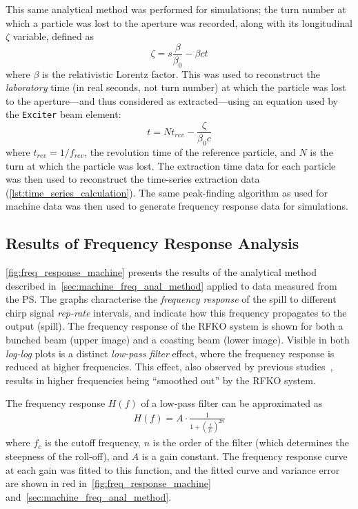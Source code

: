 \documentclass[11pt]{report}
\begin{document}
This same analytical method was performed for simulations; the turn number at which a particle was lost to the aperture was recorded, along with its longitudinal $\zeta$ variable, defined as
\begin{equation}
  \zeta = s \frac{\beta}{\beta_0} - \beta c t
\end{equation}
where $\beta$ is the relativistic Lorentz factor. This was used to reconstruct the \textit{laboratory} time (in real seconds, not turn number) at which the particle was lost to the aperture---and thus considered as extracted---using an equation used by the \verb|Exciter| beam element:
\begin{equation}
  t = N t_{rev} - \frac\zeta{\beta_0 c}
\end{equation}
where $t_{rev}=1/f_{rev}$, the revolution time of the reference particle, and $N$ is the turn at which the particle was lost. The extraction time data for each particle was then used to reconstruct the time-series extraction data (\autoref{lst:time_series_calculation}). The same peak-finding algorithm as used for machine data was then used to generate frequency response data for simulations.


\subsection{Results of Frequency Response Analysis} %
\autoref{fig:freq_response_machine} presents the results of the analytical method described in~\autoref{sec:machine_freq_anal_method} applied to data measured from the PS. The graphs characterise the \textit{frequency response} of the spill to different chirp signal \textit{rep-rate} intervals, and indicate how this frequency propagates to the output (spill). The frequency response of the RFKO system is shown for both a bunched beam (upper image) and a coasting beam (lower image). Visible in both \textit{log-log} plots is a distinct \textit{low-pass filter} effect, where the frequency response is reduced at higher frequencies. This effect, also observed by previous studies~\cite{wepmp008,Pari:2780495}, results in higher frequencies being ``smoothed out'' by the RFKO system. 

The frequency response $H(f)$ of a low-pass filter can be approximated as
\begin{eqnarray}
  H(f) = A\cdot \frac 1{1 + \left( \frac{f}{f_c} \right)^{2n}}
\end{eqnarray}
where $f_c$ is the cutoff frequency, $n$ is the order of the filter (which determines the steepness of the roll-off), and $A$ is a gain constant. The frequency response curve at each gain was fitted to this function, and the fitted curve and variance error are shown in red in~\autoref{fig:freq_response_machine} and~\autoref{sec:machine_freq_anal_method}.
\end{document}
